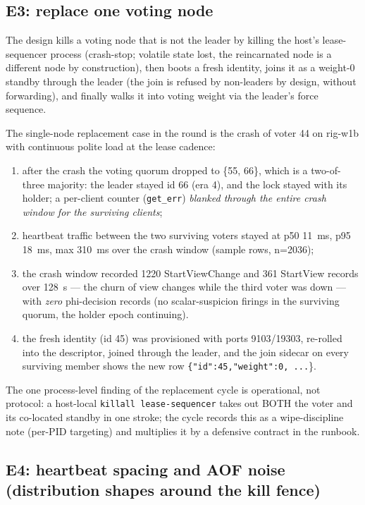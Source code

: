 \documentclass[10pt,journal,letterpaper]{IEEEtran}
\newcommand{\code}[1]{\texttt{\small #1}}
\begin{document}
\subsection{E3: replace one voting node}

The design kills a voting node that is not the leader by killing the
host's lease-sequencer process (crash-stop; volatile state lost, the
reincarnated node is a different node by construction), then boots a
fresh identity, joins it as a weight-0 standby through the leader
(the join is refused by non-leaders by design, without forwarding), and
finally walks it into voting weight via the leader's force sequence.

The single-node replacement case in the round is the crash of voter 44
on rig-w1b with continuous polite load at the lease cadence:

\begin{enumerate}
\item after the crash the voting quorum dropped to \{55, 66\}, which is
a two-of-three majority: the leader stayed id 66 (era 4), and the lock
stayed with its holder; a per-client counter (\code{get\_err})
\emph{blanked through the entire crash window for the surviving
clients};
\item heartbeat traffic between the two surviving voters stayed at
p50 11~ms, p95 18~ms, max 310~ms over the crash window (sample rows,
n=2036);
\item the crash window recorded 1220 StartViewChange and 361 StartView
records over 128~s --- the churn of view changes while the third voter
was down --- with \emph{zero} phi-decision records (no scalar-suspicion
firings in the surviving quorum, the holder epoch continuing).
\item the fresh identity (id 45) was provisioned with ports
9103/19303, re-rolled into the descriptor, joined through the leader,
and the join sidecar on every surviving member shows the new row
\code{\{"id":45,"weight":0, ...}\}.
\end{enumerate}

The one process-level finding of the replacement cycle is operational,
not protocol: a host-local \code{killall lease-sequencer} takes out
BOTH the voter and its co-located standby in one stroke; the cycle
records this as a wipe-discipline note (per-PID targeting) and
multiplies it by a defensive contract in the runbook.

\subsection{E4: heartbeat spacing and AOF noise (distribution shapes
around the kill fence)}
\end{document}

